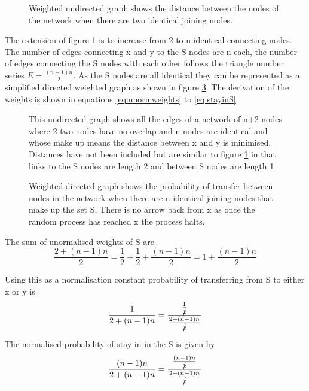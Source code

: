 \begin{figure}[ht]
    \centering
    
    \caption[Four node graph]{Weighted undirected graph shows the distance between the nodes of the network when there are two identical joining nodes.}
    \label{net:4nodes}
\end{figure}



The extension of figure \ref{net:4nodes} is to increase from 2 to n identical connecting nodes. The number of edges connecting x and y to the S nodes are n each, the number of edges connecting the S nodes with each other follows the triangle number series $E=\frac{(n-1)n}{2}$. As the S nodes are all identical they can be represented as a simplified directed weighted graph as shown in figure \ref{net:Nnodesweighted}. The derivation of the weights is shown in equations \ref{eq:unormweights} to \ref{eq:stayinS}.

\begin{figure}[ht]
    \centering
    
    \caption[N node unweighted Graph]{This undirected graph shows all the edges of a network of n+2 nodes where 2 two nodes have no overlap and n nodes are identical and whose make up means the distance between x and y is minimised. Distances have not been included but are similar to figure \ref{net:4nodes} in that links to the S nodes are length 2 and between S nodes are length 1}
    \label{net:Nnodes}
\end{figure}


\begin{figure}[ht]
    \centering
    
    \caption[N node transfer probability]{Weighted directed graph shows the probability of transfer between nodes in the network when there are n identical joining nodes that make up the set S. There is no arrow back from x as once the random process has reached x the process halts.}
    \label{net:Nnodesweighted}
\end{figure}

The sum of unormalised weights of S are 
\begin{equation}
    \frac{2+(n-1)n}{2}= \frac{1}{2}+\frac{1}{2}+\frac{(n-1)n}{2}= 1+\frac{(n-1)n}{2}
    \label{eq:unormweights}
\end{equation}

Using this as a normalisation constant probability of transferring from S to either x or y is 
\begin{equation}
    \frac{1}{2+(n-1)n}=\frac{\frac{1}{\cancel{2}}}{\frac{2+(n-1)n}{\cancel{2}}}
\end{equation}

The normalised probability of stay in in the S is given by
\begin{equation}
        \frac{(n-1)n}{2+(n-1)n}=\frac{\frac{(n-1)n}{\cancel{2}}}{\frac{2+(n-1)n}{\cancel{2}}}
        \label{eq:stayinS}
\end{equation}